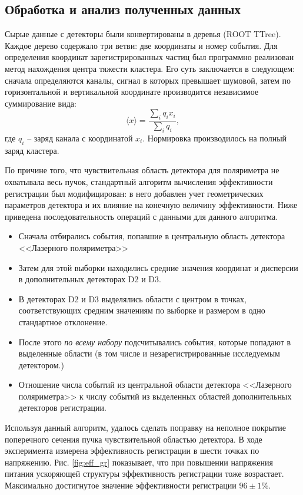 \subsection{Обработка и анализ полученных данных}\label{sec:eff_res}
Сырые данные с детекторы были конвертированы в деревья (ROOT TTree). Каждое дерево содержало три ветви: две координаты и номер события. Для определения координат зарегистрированных частиц был программно реализован метод нахождения центра тяжести кластера. Его суть заключается в следующем: сначала определяются каналы, сигнал в которых превышает шумовой, затем по горизонтальной и вертикальной координате производится независимое суммирование вида: 
\begin{equation}
 \langle x \rangle = \frac{\sum_{i}q_i x_i}{\sum_{i}q_i},
\end{equation}
где $q_i$ -- заряд канала с координатой $x_i$. Нормировка производилось на полный заряд кластера.
\par По причине того, что чувствительная область детектора для поляриметра не охватывала весь пучок, стандартный алгоритм вычисления эффективности регистрации был модифицирован: в него добавлен учет геометрических параметров детектора и их влияние на конечную величину эффективности. Ниже приведена последовательность операций с данными для данного алгоритма.
\begin{itemize}
	\item Сначала отбирались события, попавшие в центральную область детектора <<Лазерного поляриметра>>
	\item Затем для этой выборки находились средние значения координат и дисперсии в дополнительных детекторах D2 и D3. 
	\item В детекторах D2 и D3 выделялись области с центром в точках, соответствующих средним значениям по выборке и размером в одно стандартное отклонение. 
	\item После этого \textit {по всему набору} подсчитывались события, которые попадают в выделенные области (в том числе и незарегистрированные исследуемым детектором.)
	\item Отношение числа событий из центральной области детектора <<Лазерного поляриметра>> к числу событий из выделенных областей дополнительных детекторов  регистрации. 
\end{itemize}
Используя данный алгоритм, удалось сделать поправку на неполное покрытие поперечного сечения пучка чувствительной областью детектора.
В ходе эксперимента измерена эффективность регистрации в шести точках по напряжению. Рис. \ref{fig:eff_gr} показывает, что при повышении напряжения питания ускоряющей структуры эффективность регистрации тоже возрастает. Максимально достигнутое значение эффективности регистрации $96 \pm 1\%$. 
